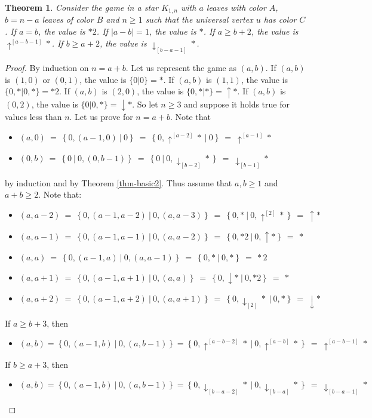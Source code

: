 \documentclass[a4paper,11pt]{article}
\newtheorem{theorem}{Theorem}
\begin{document}
\begin{theorem}\label{thm-star3}
Consider the game in a star $K_{1,n}$ with $a$ leaves with color $A$, $b=n-a$ leaves of color $B$ and $n\geq 1$ such that the universal vertex $u$ has color $C$.
If $a=b$, the value is $*2$. If $|a-b|=1$, the value is $*$.
If $a\geq b+2$, the value is $\uparrow^{[a-b-1]}*$.
If $b\geq a+2$, the value is $\downarrow_{[b-a-1]}*$.
\end{theorem}

\begin{proof}
By induction on $n=a+b$. Let us represent the game as $(a,b)$.
If $(a,b)$ is $(1,0)$ or $(0,1)$, the value is $\{0|0\}=*$.
If $(a,b)$ is $(1,1)$, the value is $\{0,*|0,*\}=*2$.
If $(a,b)$ is $(2,0)$, the value is $\{0,*|*\}=\uparrow*$.
If $(a,b)$ is $(0,2)$, the value is $\{0|0,*\}=\downarrow*$.
So let $n\geq 3$ and suppose it holds true for values less than $n$. Let us prove for $n=a+b$.
Note that
\begin{itemize}
\item $(a,0)\ =\ \left\{0,(a-1,0)\ \big|\ 0\right\}\ =\ \left\{0,\uparrow^{[a-2]}*\ \big|\ 0\right\}\ =\ \uparrow^{[a-1]}*$
\item $(0,b)\ =\ \left\{0\ \big|\ 0,(0,b-1)\right\}\ =\ \left\{0\ \big|\ 0,\downarrow_{[b-2]}*\right\}\ =\ \downarrow_{[b-1]}*$
\end{itemize}
by induction and by Theorem \ref{thm-basic2}.
Thus assume that $a,b\geq 1$ and $a+b\geq 2$.
Note that:
\begin{itemize}
\item $(a,a-2)\ =\ \left\{0,(a-1,a-2)\ \big|\ 0,(a,a-3)\right\}\ =\ \left\{0,*\ \big|\ 0,\uparrow^{[2]}*\right\}\ =\ \uparrow*$
\item $(a,a-1)\ =\ \left\{0,(a-1,a-1)\ \big|\ 0,(a,a-2)\right\}\ =\ \left\{0,*2\ \big|\ 0,\uparrow*\right\}\ =\ *$
\item $(a,a)\ =\ \left\{0,(a-1,a)\ \big|\ 0,(a,a-1)\right\}\ =\ \left\{0,*\ \big|\ 0,*\right\}\ =\ *2$
\item $(a,a+1)\ =\ \left\{0,(a-1,a+1)\ \big|\ 0,(a,a)\right\}\ =\ \left\{0,\downarrow*\ \big|\ 0,*2\right\}\ =\ *$
\item $(a,a+2)\ =\ \left\{0,(a-1,a+2)\ \big|\ 0,(a,a+1)\right\}\ =\ \left\{0,\downarrow_{[2]}*\ \big|\ 0,*\right\}\ =\ \downarrow*$
\end{itemize}
If $a\geq b+3$, then
\begin{itemize}
\item $(a,b) = \left\{0,(a-1,b)\ \big|\ 0,(a,b-1)\right\} = \left\{0,\uparrow^{[a-b-2]}*\ \big|\ 0,\uparrow^{[a-b]}*\right\}\ =\ \uparrow^{[a-b-1]}*$
\end{itemize}
If $b\geq a+3$, then
\begin{itemize}
\item $(a,b) = \left\{0,(a-1,b)\ \big|\ 0,(a,b-1)\right\} = \left\{0,\downarrow_{[b-a-2]}*\ \big|\ 0,\downarrow_{[b-a]}*\right\}\ =\ \downarrow_{[b-a-1]}*$
\end{itemize}
\end{proof}
\end{document}
